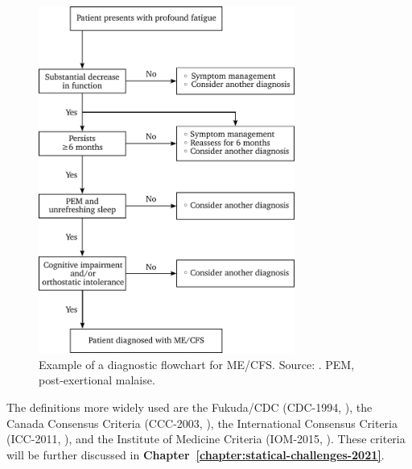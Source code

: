 \begin{figure}[htbp]
    \centering
    \includegraphics[width=0.75\textwidth]{chapter/introduction/figures/iom-diagnosis-tikz.pdf}
    \caption[Example of a diagnostic flowchart for ME/CFS]{Example of a diagnostic flowchart for ME/CFS. Source: \citet[chap.~7]{instituteofmedicine2015MyalgicEncephalomyelitis}. PEM, post-exertional malaise.}
    \label{fig:intro-flowchart}
\end{figure}

The definitions more widely used are the Fukuda/CDC (CDC-1994, \citealt{fukuda1994ChronicFatigue}), the Canada Consensus Criteria (CCC-2003, \citealt{carruthers2003MyalgicEncephalomyelitis}), the International Consensus Criteria (ICC-2011, \citealt{carruthers2011MyalgicEncephalomyelitis}), and the Institute of Medicine Criteria (IOM-2015, \citealt{instituteofmedicine2015MyalgicEncephalomyelitis}). These criteria will be further discussed in \textbf{Chapter~\ref{chapter:statical-challenges-2021}}.

